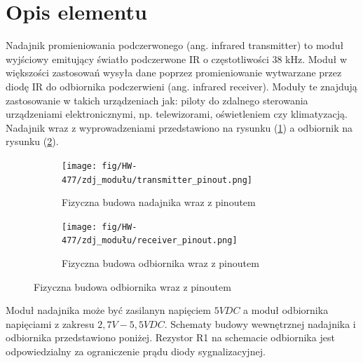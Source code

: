 \documentclass[11pt, a4paper]{article}
\author{Jakub Grzesiak}
\begin{document}
%
%
\newpage

\section*{Opis elementu}
Nadajnik promieniowania podczerwonego (ang. infrared transmitter) to moduł wyjściowy emitujący światło podczerwone IR o częstotliwości 38 kHz. Moduł w większości zastosowań wysyła dane poprzez promieniowanie wytwarzane przez diodę IR do odbiornika podczerwieni (ang. infrared receiver). Moduły te znajdują zastosowanie w takich urządzeniach jak: piloty do zdalnego sterowania urządzeniami elektronicznymi, np. telewizorami, oświetleniem czy klimatyzacją.
Nadajnik wraz z wyprowadzeniami przedstawiono na rysunku (\ref{fig:_transmitter_pinout}) a odbiornik na rysunku (\ref{fig:_receiver_pinout}).


\vspace{0.25cm}
\begin{figure}[h]
\centering
\begin{subfigure}{.5\textwidth}
\centering
\texttt{[image: fig/HW-477/zdj\_modułu/transmitter\_pinout.png]}
\caption{Fizyczna budowa nadajnika wraz z pinoutem}
\label{fig:_transmitter_pinout}
\end{subfigure}%
\begin{subfigure}{.5\textwidth}
\centering
\texttt{[image: fig/HW-477/zdj\_modułu/receiver\_pinout.png]}
\caption{Fizyczna budowa odbiornika wraz z pinoutem}
\label{fig:_receiver_pinout}
\end{subfigure}
\label{fig:element}
\end{figure}
\vspace{0.25cm}

Moduł nadajnika może być zasilanyn napięciem $5V DC$ a moduł odbiornika napięciami z zakresu $2,7V - 5,5V DC$.
Schematy budowy wewnętrznej nadajnika i odbiornika przedstawiono poniżej. Rezystor R1 na schemacie odbiornika jest odpowiedzialny za ograniczenie prądu diody sygnalizacyjnej.
\end{document}
